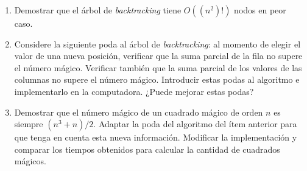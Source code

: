 {\begin{enunciado}{\ejercicio[MagiCuadrados]}
\begin{enumerate}[label=$\alph*$)]
\begin{enumerate}[label=\tiny$\blacksquare$]
            \end{enumerate}

            Mostrar los primeros dos niveles del árbol de \textit{backtracking} para $n=3$.

      \item Demostrar que el árbol de \textit{backtracking} tiene $O((n^2)!)$ nodos en peor caso.

      \item Considere la siguiente poda al árbol de \textit{backtracking}: al momento de elegir el valor de una nueva
            posición, verificar que la suma parcial de la fila no supere el número mágico.
            Verificar también que la suma parcial de los valores de las columnas no supere el número mágico.
            Introducir estas podas al algoritmo e implementarlo en la computadora. ¿Puede mejorar
            estas podas?

      \item Demostrar que el número mágico de un cuadrado mágico de orden $n$ es siempre $(n^3 + n)/2$.
            Adaptar la poda del algoritmo del ítem anterior para que tenga en cuenta esta nueva
            información. Modificar la implementación y comparar los tiempos obtenidos para calcular
            la cantidad de cuadrados mágicos.
    \end{enumerate}
  \end{enunciado}
}

